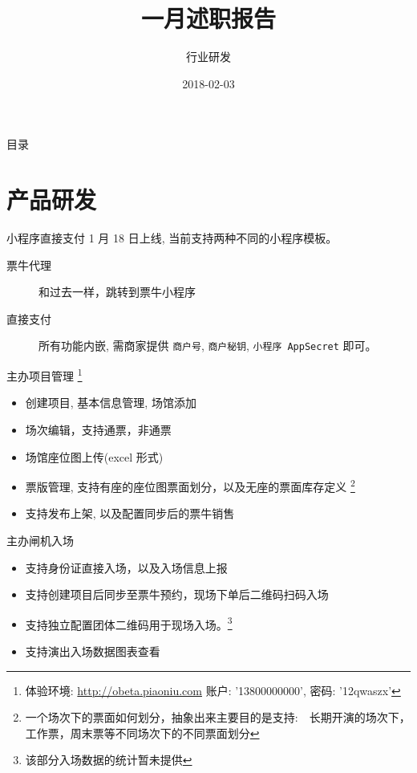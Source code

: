 \documentclass[presentation, bigger]{beamer}
\author{行业研发}
\date{2018-02-03}
\title{一月述职报告}
\begin{document}
\maketitle
\begin{frame}{目录}
\tableofcontents
\end{frame}


\section{产品研发}
\label{sec:org5c2444e}
\begin{frame}[fragile,label={sec:org84d87e0}]{小程序直接支付}
 1 月 18 日上线, 当前支持两种不同的小程序模板。

\begin{description}
\item[{票牛代理}] 和过去一样，跳转到票牛小程序
\item[{直接支付}] 所有功能内嵌, 需商家提供 \texttt{商户号}, \texttt{商户秘钥}, \texttt{小程序 AppSecret} 即可。
\end{description}
\end{frame}
\begin{frame}[label={sec:orgffee8d0}]{主办项目管理 \footnote{体验环境: \url{http://obeta.piaoniu.com} 账户: '13800000000', 密码: '12qwaszx'}}
\begin{itemize}
\item 创建项目, 基本信息管理, 场馆添加
\item 场次编辑，支持通票，非通票
\item 场馆座位图上传(excel 形式)
\item 票版管理, 支持有座的座位图票面划分，以及无座的票面库存定义 \footnote{一个场次下的票面如何划分，抽象出来主要目的是支持:　长期开演的场次下，工作票，周末票等不同场次下的不同票面划分}
\item 支持发布上架, 以及配置同步后的票牛销售
\end{itemize}
\end{frame}
\begin{frame}[label={sec:orgcc2b1c5}]{主办闸机入场}
\begin{itemize}
\item 支持身份证直接入场，以及入场信息上报
\item 支持创建项目后同步至票牛预约，现场下单后二维码扫码入场
\item 支持独立配置团体二维码用于现场入场。\footnote{该部分入场数据的统计暂未提供}
\item 支持演出入场数据图表查看
\end{itemize}
\end{frame}
\end{document}

